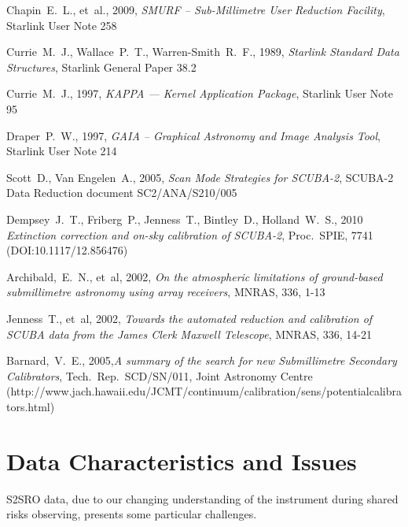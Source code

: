 \documentclass[twoside,11pt]{article}
\newcommand{\htmladdnormallink}[2]{#1}
\newcommand{\xref}[3]{#1}
\newcommand{\xlabel}[1]{}
\renewcommand{\_}{\texttt{\symbol{95}}}
\begin{document}
\begin{thebibliography}{}

Chapin~E.~L., et~al., 2009, \textit{SMURF -- Sub-Millimetre User Reduction
Facility},
\xref{Starlink User Note 258}{sun258}{}

Currie~M.~J., Wallace~P.~T., Warren-Smith~R.~F., 1989, \textit{Starlink Standard Data Structures}, \xref{Starlink General Paper 38.2}{sgp38}{}

Currie~M.~J., 1997, \textit{KAPPA --- Kernel Application Package},
\xref{Starlink User Note 95}{sun95}{}

Draper~P.~W., 1997, \textit{GAIA -- Graphical Astronomy and Image
Analysis Tool},
\xref{Starlink User Note 214}{sun214}{}

Scott~D., Van Engelen~A., 2005, \textit{Scan Mode Strategies for
  SCUBA-2}, SCUBA-2 Data Reduction document SC2/ANA/S210/005

Dempsey~J.~T., Friberg~P., Jenness~T., Bintley~D., Holland~W.~S., 2010
\textit{Extinction correction and on-sky calibration of SCUBA-2},
Proc.\ SPIE, 7741 (DOI:10.1117/12.856476)

Archibald,~E.~N., et~al, 2002, \textit{On the atmospheric limitations of ground-based submillimetre astronomy using array receivers},
MNRAS, 336, 1-13

Jenness~T., et~al, 2002, \textit{Towards the automated reduction and calibration of SCUBA data from the James Clerk Maxwell Telescope},
MNRAS, 336, 14-21

Barnard,~V.~E., 2005,\textit{A summary of the search for new Submillimetre Secondary Calibrators},
Tech.\ Rep.\ SCD/SN/011, Joint Astronomy Centre
(\htmladdnormallink{http://www.jach.hawaii.edu/JCMT/continuum/calibration/sens/potentialcalibrators.html}{http://www.jach.hawaii.edu/JCMT/continuum/calibration/sens/potentialcalibrators.html})

\end{thebibliography}

\newpage
\appendix

\section{\xlabel{Dataissues}Data Characteristics and Issues}
\label{sec:Issues}

S2SRO data, due to our changing understanding of the instrument during
shared risks observing, presents some particular challenges.
\end{document}
